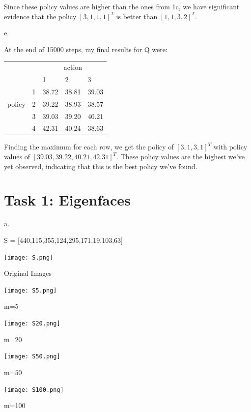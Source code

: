 \documentclass{article}
\begin{document}
\noindent
Since these policy values are higher than the ones from 1c, we have significant evidence that the policy $[3,1,1,1]^T$ is better than $[1,1,3,2]^T$.

\medskip
\noindent 
e. 

\noindent
At the end of 15000 steps, my final results for Q were:
\begin{table}[htb]
\begin{tabular}{lllll}
       &   & \multicolumn{3}{c}{action} \\
       &   & 1       & 2       & 3      \\
       & 1 & 38.72   & 38.81   & 39.03  \\
policy & 2 & 39.22   & 38.93   & 38.57  \\
       & 3 & 39.03   & 39.20   & 40.21  \\
       & 4 & 42.31   & 40.24   & 38.63 
\end{tabular}
\end{table}

\noindent 
Finding the maximum for each row, we get the policy of $[3,1,3,1]^T$ with policy values of $[39.03,39.22,40.21,42.31]^T$. These policy values are the highest we've yet observed, indicating that this is the best policy we've found.

\section{Task 1: Eigenfaces}

a.

S = [440,115,355,124,295,171,19,103,63]

\begin{center}
    \texttt{[image: S.png]}
    \caption{Original Images}
\end{center}

\begin{center}
    \texttt{[image: S5.png]}
    \caption{m=5}
\end{center}

\begin{center}
    \texttt{[image: S20.png]}
    \caption{m=20}
\end{center}

\begin{center}
    \texttt{[image: S50.png]}
    \caption{m=50}
\end{center}

\begin{center}
    \texttt{[image: S100.png]}
    \caption{m=100}
\end{center}
\end{document}
